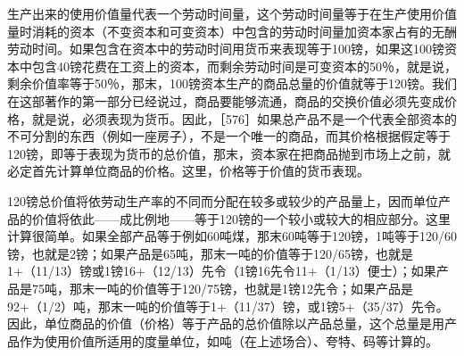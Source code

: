 生产出来的使用价值量代表一个劳动时间量，这个劳动时间量等于在生产使用价值量时消耗的资本（不变资本和可变资本）中包含的劳动时间量加资本家占有的无酬劳动时间。如果包含在资本中的劳动时间用货币来表现等于100镑，如果这100镑资本中包含40镑花费在工资上的资本，而剩余劳动时间是可变资本的50％，就是说，剩余价值率等于50％，那末，100镑资本生产的商品总量的价值就等于120镑。我们在这部著作的第一部分已经说过，商品要能够流通，商品的交换价值必须先变成价格，就是说，必须表现为货币。因此，［576］如果总产品不是一个代表全部资本的不可分割的东西（例如一座房子），不是一个唯一的商品，而其价格根据假定等于120镑，即等于表现为货币的总价值，那末，资本家在把商品抛到市场上之前，就必定首先计算单位商品的价格。这里，价格等于价值的货币表现。

120镑总价值将依劳动生产率的不同而分配在较多或较少的产品量上，因而单位产品的价值将依此——成比例地——等于120镑的一个较小或较大的相应部分。这里计算很简单。如果全部产品等于例如60吨煤，那末60吨等于120镑，1吨等于120/60镑，也就是2镑；如果产品是65吨，那末一吨的价值等于120/65镑，也就是1+（11/13）镑或1镑16+（12/13）先令（1镑16先令11+（1/13）便士）；如果产品是75吨，那末一吨的价值等于120/75镑，也就是1镑12先令；如果产品是92+（1/2）吨，那末一吨的价值等于1+（11/37）镑，或1镑5+（35/37）先令。因此，单位商品的价值（价格）等于产品的总价值除以产品总量，这个总量是用产品作为使用价值所适用的度量单位，如吨（在上述场合）、夸特、码等计算的。

